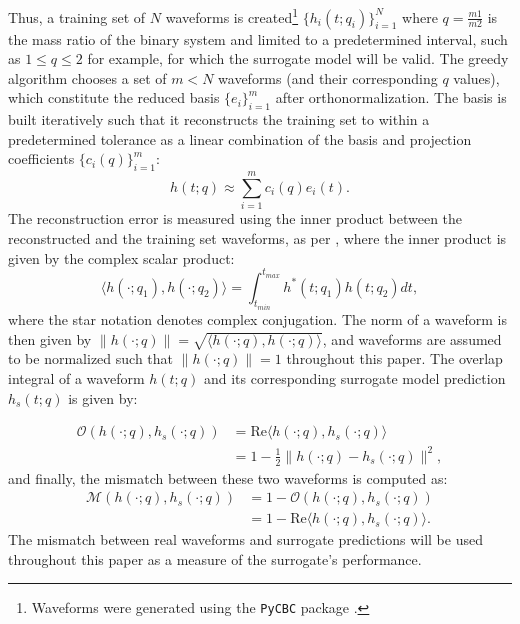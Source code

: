\documentclass[preprint,12pt]{elsarticle}
\begin{document}
Thus, a training set of $N$ waveforms is created\footnote{Waveforms were generated using the \texttt{PyCBC} package \cite{pycbc}.} $\{ h_i(t;q_i) \}_{i=1}^{N}$ where $q=\frac{m1}{m2}$ is the mass ratio of the binary system and limited to a predetermined interval, such as $1\leq q \leq 2$ for example, for which the surrogate model will be valid. The greedy algorithm chooses a set of $m < N$ waveforms (and their corresponding $q$ values), which constitute the reduced basis $\{e_i\}_{i=1}^{m}$ after orthonormalization. The basis is built iteratively such that it reconstructs the training set to within a predetermined tolerance as a linear combination of the basis and projection coefficients $\{c_i(q)\}_{i=1}^{m}$:
\begin{equation}
    h(t;q) \approx \sum_{i=1}^{m} c_i(q) e_i(t).
\end{equation}
The reconstruction error is measured using the inner product between the reconstructed and the training set waveforms, as per \cite{field2014fast}, where the inner product is given by the complex scalar product:
\begin{equation}
    \langle h(\cdot; q_1), h(\cdot; q_2) \rangle = \int_{t_{min}}^{t_{max}} h^{*}(t;q_1) h(t;q_2) dt,
\end{equation}
where the star notation denotes complex conjugation. The norm of a waveform is then given by $\|h(\cdot;q) \| = \sqrt{\langle h(\cdot;q),h(\cdot;q) \rangle}$, and waveforms are assumed to be normalized such that $\|h(\cdot;q) \| = 1$ throughout this paper. The overlap integral of a waveform $h(t;q)$ and its corresponding surrogate model prediction $h_s(t;q)$ is given by:

\begin{align}
    \mathcal{O}(h(\cdot;q),h_s(\cdot;q)) &= \text{Re}\langle h(\cdot;q),h_s(\cdot;q) \rangle \\
    &= 1 - \frac{1}{2} \|h(\cdot;q) - h_s(\cdot;q) \|^2,
\end{align}
and finally, the mismatch between these two waveforms is computed as:
\begin{align}
    \label{eq:mismatch}
    \mathcal{M}(h(\cdot;q),h_s(\cdot;q)) &= 1 - \mathcal{O}(h(\cdot;q),h_s(\cdot;q)) \\
    &= 1 - \text{Re}\langle h(\cdot;q),h_s(\cdot;q) \rangle.
\end{align}
The mismatch between real waveforms and surrogate predictions will be used throughout this paper as a measure of the surrogate's performance.
\end{document}
